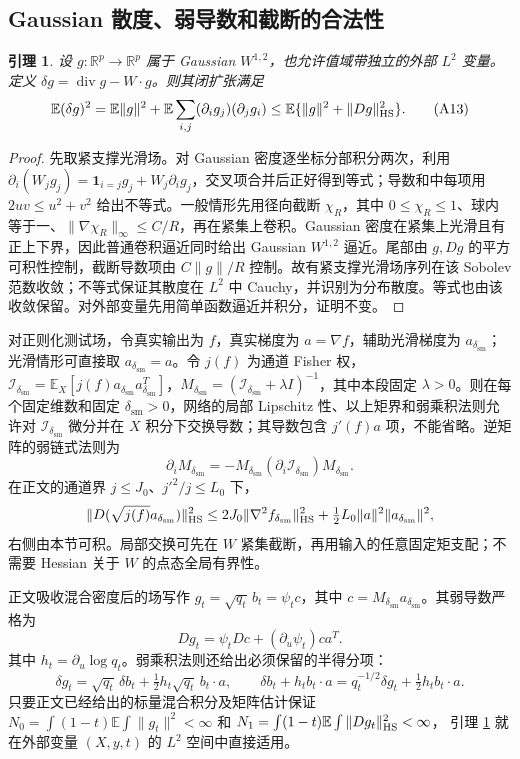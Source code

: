 \documentclass[a4paper]{tufte-handout}
\newtheorem{lemma}{引理}
\newcommand{\dsm}{\delta_{\mathrm{sm}}}
\begin{document}
\begin{fullwidth}
\subsection{Gaussian 散度、弱导数和截断的合法性}
\begin{lemma}\label{an:sobolev}
设 $g:\mathbb R^p\to\mathbb R^p$ 属于 Gaussian $W^{1,2}$，也允许值域带独立的外部 $L^2$ 变量。定义
$\delta g=\operatorname{div}g-W\cdot g$。则其闭扩张满足
\[
 \mathbb E(\delta g)^2
 =\mathbb E\|g\|^2+\mathbb E\sum_{i,j}(\partial_i g_j)(\partial_jg_i)
 \le\mathbb E\{\|g\|^2+\|Dg\|_{\rm HS}^2\}. \tag{A13}\label{an:divergence}
\]
\end{lemma}
\begin{proof}
先取紧支撑光滑场。对 Gaussian 密度逐坐标分部积分两次，利用
$\partial_i(W_jg_j)=\boldsymbol1_{i=j}g_j+W_j\partial_i g_j$，交叉项合并后正好得到等式；导数和中每项用 $2uv\le u^2+v^2$ 给出不等式。一般情形先用径向截断 $\chi_R$，其中 $0\le\chi_R\le1$、球内等于一、$\|\nabla\chi_R\|_\infty\le C/R$，再在紧集上卷积。Gaussian 密度在紧集上光滑且有正上下界，因此普通卷积逼近同时给出 Gaussian $W^{1,2}$ 逼近。尾部由 $g,Dg$ 的平方可积性控制，截断导数项由 $C\|g\|/R$ 控制。故有紧支撑光滑场序列在该 Sobolev 范数收敛；不等式保证其散度在 $L^2$ 中 Cauchy，并识别为分布散度。等式也由该收敛保留。对外部变量先用简单函数逼近并积分，证明不变。
\end{proof}

对正则化测试场，令真实输出为 $f$，真实梯度为 $a=\nabla f$，辅助光滑梯度为 $a_{\dsm}$；光滑情形可直接取 $a_{\dsm}=a$。令 $j(f)$ 为通道 Fisher 权，$\mathcal I_{\dsm}=\mathbb E_X[j(f)a_{\dsm} a_{\dsm}^T]$，$M_{\dsm}=(\mathcal I_{\dsm}+\lambda I)^{-1}$，其中本段固定 $\lambda>0$。则在每个固定维数和固定 $\dsm>0$，网络的局部 Lipschitz 性、以上矩界和弱乘积法则允许对 $\mathcal I_{\dsm}$ 微分并在 $X$ 积分下交换导数；其导数包含 $j'(f)a$ 项，不能省略。逆矩阵的弱链式法则为
\[
 \partial_iM_{\dsm}=-M_{\dsm}(\partial_i\mathcal I_{\dsm})M_{\dsm}.
\]
在正文的通道界 $j\le J_0$、$j'^2/j\le L_0$ 下，
\[
 \|D(\sqrt{j(f)}a_{\dsm})\|_{\rm HS}^2
 \le2J_0\|\nabla^2f_{\dsm}\|_{\rm HS}^2
       +\tfrac12L_0\|a\|^2\|a_{\dsm}\|^2,
\]
右侧由本节可积。局部交换可先在 $W$ 紧集截断，再用输入的任意固定矩支配；不需要 Hessian 关于 $W$ 的点态全局有界性。

正文吸收混合密度后的场写作 $g_t=\sqrt{q_t}\,b_t=\psi_t c$，其中 $c=M_{\dsm} a_{\dsm}$。其弱导数严格为
\[
 Dg_t=\psi_t Dc+(\partial_u\psi_t)c a^T.
\]
其中 $h_t=\partial_u\log q_t$。弱乘积法则还给出必须保留的半得分项：
\[
 \delta g_t=\sqrt{q_t}\,\delta b_t+\tfrac12h_t\sqrt{q_t}\,b_t\cdot a,
 \qquad
 \delta b_t+h_tb_t\cdot a=q_t^{-1/2}\delta g_t+\tfrac12h_tb_t\cdot a.
\]
只要正文已经给出的标量混合积分及矩阵估计保证
$N_0=\int(1-t)\mathbb E\int\|g_t\|^2<\infty$ 和
$N_1=\int(1-t)\mathbb E\int\|Dg_t\|_{\rm HS}^2<\infty$，
引理 \ref{an:sobolev} 就在外部变量 $(X,y,t)$ 的 $L^2$ 空间中直接适用。


\end{fullwidth}
\end{document}
